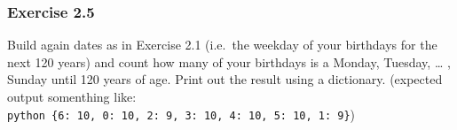 \documentclass[11pt]{article}
\begin{document}
\hypertarget{exercise-2.5}{%
\subsubsection{Exercise 2.5}\label{exercise-2.5}}

Build again dates as in Exercise 2.1 (i.e.~the weekday of your birthdays
for the next 120 years) and count how many of your birthdays is a
Monday, Tuesday, \ldots{} , Sunday until 120 years of age. Print out the
result using a dictionary. (expected output somenthing like:
\texttt{python\ \{6:\ 10,\ 0:\ 10,\ 2:\ 9,\ 3:\ 10,\ 4:\ 10,\ 5:\ 10,\ 1:\ 9\}})


    
    
    
    
\end{document}
